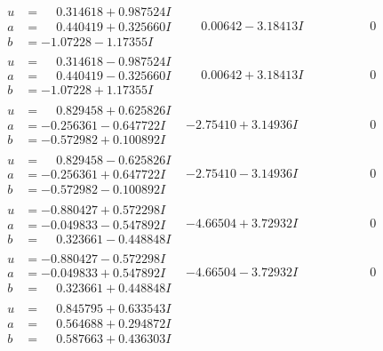 \documentclass[1p]{elsarticle_modified}
\theoremstyle{definition}
\begin{document}
$$\begin{array}{c|c|c}
\begin{aligned}
u &= \phantom{-}0.314618 + 0.987524 I \\
a &= \phantom{-}0.440419 + 0.325660 I \\
b &= -1.07228 - 1.17355 I\end{aligned}
 & \phantom{-}0.00642 - 3.18413 I & \phantom{-0.000000 } 0 \\ \hline\begin{aligned}
u &= \phantom{-}0.314618 - 0.987524 I \\
a &= \phantom{-}0.440419 - 0.325660 I \\
b &= -1.07228 + 1.17355 I\end{aligned}
 & \phantom{-}0.00642 + 3.18413 I & \phantom{-0.000000 } 0 \\ \hline\begin{aligned}
u &= \phantom{-}0.829458 + 0.625826 I \\
a &= -0.256361 - 0.647722 I \\
b &= -0.572982 + 0.100892 I\end{aligned}
 & -2.75410 + 3.14936 I & \phantom{-0.000000 } 0 \\ \hline\begin{aligned}
u &= \phantom{-}0.829458 - 0.625826 I \\
a &= -0.256361 + 0.647722 I \\
b &= -0.572982 - 0.100892 I\end{aligned}
 & -2.75410 - 3.14936 I & \phantom{-0.000000 } 0 \\ \hline\begin{aligned}
u &= -0.880427 + 0.572298 I \\
a &= -0.049833 - 0.547892 I \\
b &= \phantom{-}0.323661 - 0.448848 I\end{aligned}
 & -4.66504 + 3.72932 I & \phantom{-0.000000 } 0 \\ \hline\begin{aligned}
u &= -0.880427 - 0.572298 I \\
a &= -0.049833 + 0.547892 I \\
b &= \phantom{-}0.323661 + 0.448848 I\end{aligned}
 & -4.66504 - 3.72932 I & \phantom{-0.000000 } 0 \\ \hline\begin{aligned}
u &= \phantom{-}0.845795 + 0.633543 I \\
a &= \phantom{-}0.564688 + 0.294872 I \\
b &= \phantom{-}0.587663 + 0.436303 I\end{aligned}

\end{array}$$
\end{document}
